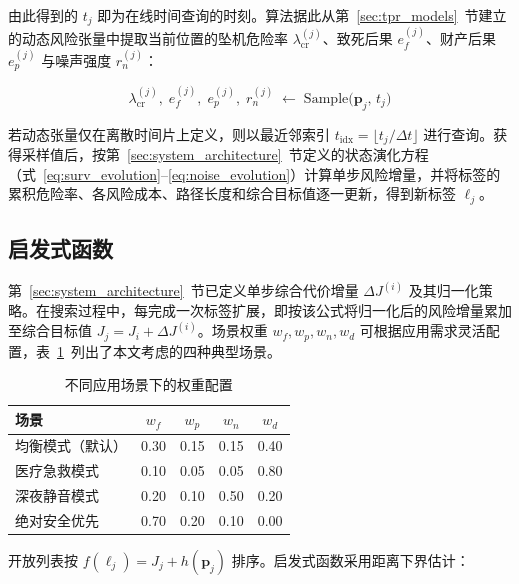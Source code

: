 由此得到的 $t_j$ 即为在线时间查询的时刻。算法据此从第~\ref{sec:tpr_models}~节建立的动态风险张量中提取当前位置的坠机危险率 $\lambda_{\mathrm{cr}}^{(j)}$、致死后果 $e_f^{(j)}$、财产后果 $e_p^{(j)}$ 与噪声强度 $r_n^{(j)}$：

\begin{equation}
\lambda_{\mathrm{cr}}^{(j)},\;
e_f^{(j)},\;
e_p^{(j)},\;
r_n^{(j)}
\;\leftarrow\;
\mathrm{Sample}\bigl(\mathbf{p}_j,\, t_j\bigr)
\label{eq:online_sampling}
\end{equation}

若动态张量仅在离散时间片上定义，则以最近邻索引 $t_{\mathrm{idx}} = \lfloor t_j / \Delta t \rfloor$ 进行查询。获得采样值后，按第~\ref{sec:system_architecture}~节定义的状态演化方程（式~\ref{eq:surv_evolution}--\ref{eq:noise_evolution}）计算单步风险增量，并将标签的累积危险率、各风险成本、路径长度和综合目标值逐一更新，得到新标签 $\ell_j$。

\subsection{启发式函数}
\label{subsec:objective}

第~\ref{sec:system_architecture}~节已定义单步综合代价增量 $\Delta J^{(i)}$ 及其归一化策略。在搜索过程中，每完成一次标签扩展，即按该公式将归一化后的风险增量累加至综合目标值 $J_j = J_i + \Delta J^{(i)}$。场景权重 $w_f, w_p, w_n, w_d$ 可根据应用需求灵活配置，表~\ref{tab:weight_scenarios}~列出了本文考虑的四种典型场景。

\begin{table}[htbp]
\centering
\caption{不同应用场景下的权重配置}
\label{tab:weight_scenarios}
\renewcommand{\arraystretch}{1.25}
\begin{tabular}{l c c c c}
\toprule
场景 & $w_f$ & $w_p$ & $w_n$ & $w_d$ \\
\midrule
均衡模式（默认）     & 0.30 & 0.15 & 0.15 & 0.40 \\
医疗急救模式         & 0.10 & 0.05 & 0.05 & 0.80 \\
深夜静音模式         & 0.20 & 0.10 & 0.50 & 0.20 \\
绝对安全优先         & 0.70 & 0.20 & 0.10 & 0.00 \\
\bottomrule
\end{tabular}
\end{table}

开放列表按 $f(\ell_j) = J_j + h(\mathbf{p}_j)$ 排序。启发式函数采用距离下界估计：

